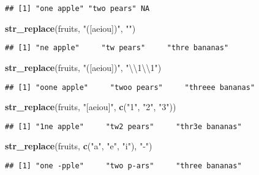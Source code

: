 \documentclass[]{article}
\newenvironment{Shaded}{\begin{snugshade}}{\end{snugshade}}
\newcommand{\KeywordTok}[1]{\textcolor[rgb]{0.13,0.29,0.53}{\textbf{#1}}}
\newcommand{\CharTok}[1]{\textcolor[rgb]{0.31,0.60,0.02}{#1}}
\newcommand{\StringTok}[1]{\textcolor[rgb]{0.31,0.60,0.02}{#1}}
\newcommand{\NormalTok}[1]{#1}
\begin{document}
\begin{verbatim}
## [1] "one apple" "two pears" NA
\end{verbatim}

\begin{Shaded}
\begin{Highlighting}[]
\KeywordTok{str_replace}\NormalTok{(fruits, }\StringTok{"([aeiou])"}\NormalTok{, }\StringTok{""}\NormalTok{)}
\end{Highlighting}
\end{Shaded}

\begin{verbatim}
## [1] "ne apple"     "tw pears"     "thre bananas"
\end{verbatim}

\begin{Shaded}
\begin{Highlighting}[]
\KeywordTok{str_replace}\NormalTok{(fruits, }\StringTok{"([aeiou])"}\NormalTok{, }\StringTok{"}\CharTok{\textbackslash{}\textbackslash{}}\StringTok{1}\CharTok{\textbackslash{}\textbackslash{}}\StringTok{1"}\NormalTok{)}
\end{Highlighting}
\end{Shaded}

\begin{verbatim}
## [1] "oone apple"     "twoo pears"     "threee bananas"
\end{verbatim}

\begin{Shaded}
\begin{Highlighting}[]
\KeywordTok{str_replace}\NormalTok{(fruits, }\StringTok{"[aeiou]"}\NormalTok{, }\KeywordTok{c}\NormalTok{(}\StringTok{"1"}\NormalTok{, }\StringTok{"2"}\NormalTok{, }\StringTok{"3"}\NormalTok{))}
\end{Highlighting}
\end{Shaded}

\begin{verbatim}
## [1] "1ne apple"     "tw2 pears"     "thr3e bananas"
\end{verbatim}

\begin{Shaded}
\begin{Highlighting}[]
\KeywordTok{str_replace}\NormalTok{(fruits, }\KeywordTok{c}\NormalTok{(}\StringTok{"a"}\NormalTok{, }\StringTok{"e"}\NormalTok{, }\StringTok{"i"}\NormalTok{), }\StringTok{"-"}\NormalTok{)}
\end{Highlighting}
\end{Shaded}

\begin{verbatim}
## [1] "one -pple"     "two p-ars"     "three bananas"
\end{verbatim}
\end{document}

